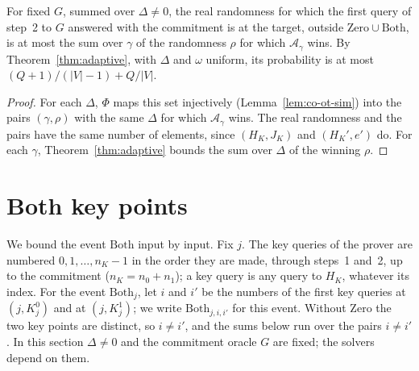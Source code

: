 \begin{corollary}
  \label{cor:co-ot}
  \leanok
  For fixed $G$, summed over $\Delta \neq 0$, the real randomness for which the first query of
  step~2 to $G$ answered with the commitment is at the target, outside $\mathrm{Zero} \cup
  \mathrm{Both}$, is at most the sum over $\gamma$ of the randomness $\rho$ for which
  $\mathcal{A}_\gamma$ wins. By Theorem~\ref{thm:adaptive}, with $\Delta$ and $\omega$ uniform, its
  probability is at most $(Q + 1)/(|V| - 1) + Q/|V|$.
\end{corollary}

\begin{proof}
  \leanok
  For each $\Delta$, $\Phi$ maps this set injectively (Lemma~\ref{lem:co-ot-sim}) into the pairs
  $(\gamma, \rho)$ with the same $\Delta$ for which $\mathcal{A}_\gamma$ wins. The real randomness
  and the pairs have the same number of elements, since $(H_K, J_K)$ and $(H_K', e')$ do. For each
  $\gamma$, Theorem~\ref{thm:adaptive} bounds the sum over $\Delta$ of the winning $\rho$.
\end{proof}

\section{Both key points}

We bound the event $\mathrm{Both}$ input by input. Fix $j$. The key queries of the prover are
numbered $0, 1, \dots, n_K - 1$ in the order they are made, through steps~1 and~2, up to the
commitment ($n_K = n_0 + n_1$); a key query is any query to $H_K$, whatever its index. For the event
$\mathrm{Both}_j$, let $i$ and $i'$ be the numbers of the first key queries at $(j, K^0_j)$ and at
$(j, K^1_j)$; we write $\mathrm{Both}_{j,i,i'}$ for this event. Without $\mathrm{Zero}$ the two key
points are distinct, so $i \neq i'$, and the sums below run over the pairs $i \neq i'$. In this section $\Delta \neq 0$ and the commitment oracle $G$ are fixed; the
solvers depend on them.

